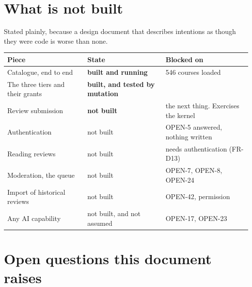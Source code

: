 \documentclass[11pt,a4paper]{article}
\begin{document}
\newpage
\section{What is not built}

Stated plainly, because a design document that describes intentions as though
they were code is worse than none.

\begin{center}
\sffamily\small
\begin{tabular}{@{}p{4.6cm}p{4.0cm}p{5.4cm}@{}}
\toprule
\textbf{Piece} & \textbf{State} & \textbf{Blocked on} \\
\midrule
Catalogue, end to end & \textbf{built and running} & 546 courses loaded \\
The three tiers and their grants & \textbf{built, and tested by mutation} & \\
Review submission & \textbf{not built} & the next thing. Exercises the kernel \\
Authentication & not built & OPEN-5 answered, nothing written \\
Reading reviews & not built & needs authentication (FR-D13) \\
Moderation, the queue & not built & OPEN-7, OPEN-8, OPEN-24 \\
Import of historical reviews & not built & OPEN-42, permission \\
Any AI capability & not built, and not assumed & OPEN-17, OPEN-23 \\
\bottomrule
\end{tabular}
\end{center}

\section{Open questions this document raises}
\end{document}
